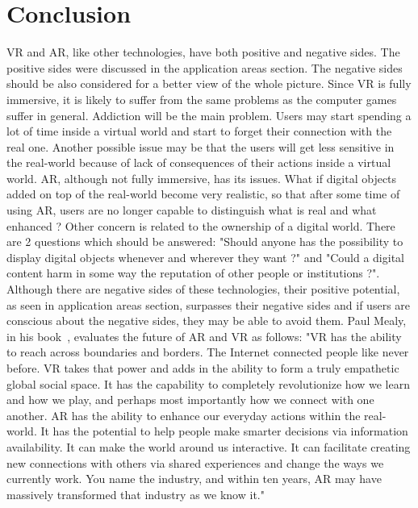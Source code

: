\documentclass[12pt]{article}
\begin{document}
\section{Conclusion} \label{sec:Conclusion}
\ac{VR} and \ac{AR}, like other technologies, have both positive and negative sides. The positive sides were discussed in the application areas section. The negative sides should be also considered for a better view of the whole picture. Since \ac{VR} is fully immersive, it is likely to suffer from the same problems as the computer games suffer in general. Addiction will be the main problem. Users may start spending a lot of time inside a virtual world and start to forget their connection with the real one. Another possible issue may be that the users will get less sensitive in the real-world because of lack of consequences of their actions inside a virtual world. \ac{AR}, although not fully immersive, has its issues. What if digital objects added on top of the real-world become very realistic, so that after some time of using \ac{AR}, users are no longer capable to distinguish what is real and what enhanced ? Other concern is related to the ownership of a digital world. There are 2 questions which should be answered: "Should anyone has the possibility to display digital objects whenever and wherever they want ?" and "Could a digital content harm in some way the reputation of other people or institutions ?". Although there are negative sides of these technologies, their positive potential, as seen in application areas section, surpasses their negative sides and if users are conscious about the negative sides, they may be able to avoid them. Paul Mealy, in his book~\cite{dummies}, evaluates the future of \ac{AR} and \ac{VR} as follows: "\ac{VR} has the ability to reach across boundaries and borders. The Internet connected people like never before. \ac{VR} takes that power and adds in the ability to form a truly empathetic global social space. It has the capability to completely revolutionize how we learn and how we play, and perhaps most importantly how we connect with one another. \ac{AR} has the ability to enhance our everyday actions within the real-world. It has the potential to help people make smarter decisions via information availability. It can make the world around us interactive. It can facilitate creating new connections with others via shared experiences and change the ways we currently work. You name the industry, and within ten years, \ac{AR} may have massively transformed that industry as we know it." 
\end{document}
